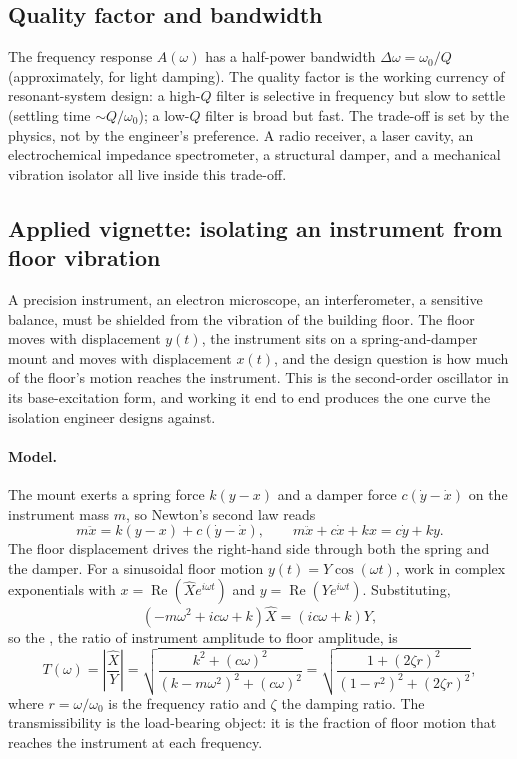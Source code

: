\subsection{Quality factor and bandwidth}

The frequency response $A(\omega)$ has a half-power bandwidth
$\Delta\omega = \omega_{0}/Q$ (approximately, for light damping).
The quality factor is the working currency of resonant-system
design: a high-$Q$ filter is selective in frequency but slow to
settle (settling time $\sim Q/\omega_{0}$); a low-$Q$ filter is
broad but fast. The trade-off is set by the physics, not by the
engineer's preference. A radio receiver, a laser cavity, an
electrochemical impedance spectrometer, a structural damper, and a
mechanical vibration isolator all live inside this trade-off.

\subsection{Applied vignette: isolating an instrument from floor vibration}

A precision instrument, an electron microscope, an interferometer, a
sensitive balance, must be shielded from the vibration of the building
floor. The floor moves with displacement $y(t)$, the instrument sits on
a spring-and-damper mount and moves with displacement $x(t)$, and the
design question is how much of the floor's motion reaches the
instrument. This is the second-order oscillator in its base-excitation
form, and working it end to end produces the one curve the isolation
engineer designs against.

\paragraph{Model.} The mount exerts a spring force $k(y - x)$ and a
damper force $c(\dot{y} - \dot{x})$ on the instrument mass $m$, so
Newton's second law reads
\[
m\ddot{x} = k(y - x) + c(\dot{y} - \dot{x}),
\qquad
m\ddot{x} + c\dot{x} + k x = c\dot{y} + k y.
\]
The floor displacement drives the right-hand side through both the
spring and the damper. For a sinusoidal floor motion $y(t) =
Y\cos(\omega t)$, work in complex exponentials with $x =
\operatorname{Re}(\hat{X} e^{i\omega t})$ and $y =
\operatorname{Re}(Y e^{i\omega t})$. Substituting,
\[
(-m\omega^{2} + i c\omega + k)\hat{X} = (i c\omega + k) Y,
\]
so the , the ratio of instrument amplitude to
floor amplitude, is
\[
T(\omega) = \left|\frac{\hat{X}}{Y}\right|
= \sqrt{\frac{k^{2} + (c\omega)^{2}}{(k - m\omega^{2})^{2} +
(c\omega)^{2}}}
= \sqrt{\frac{1 + (2\zeta r)^{2}}{(1 - r^{2})^{2} + (2\zeta r)^{2}}},
\]
where $r = \omega/\omega_{0}$ is the frequency ratio and $\zeta$ the
damping ratio. The transmissibility is the load-bearing object: it is
the fraction of floor motion that reaches the instrument at each
frequency.

